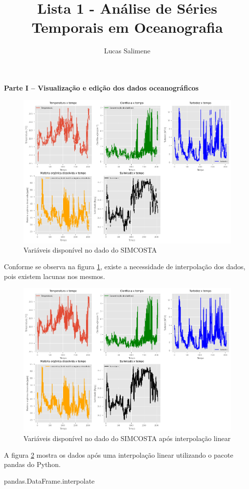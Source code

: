 \documentclass[12pt,a4paper,portuguese]{article}
\title{Lista 1 - Análise de Séries Temporais em Oceanografia}
\author{Lucas Salimene}
\date{}
\begin{document}
	
	\maketitle
	\newpage
	
	\textbf{Parte I – Visualização e edição dos dados oceanográficos}
	
	

\begin{figure}[H]
	\centering
	\includegraphics[width=1\linewidth]{lista1-1b}
	\caption{Variáveis disponível no dado do SIMCOSTA}
	\label{fig:lista1-1b}
\end{figure}
	Conforme se observa na figura \ref{fig:lista1-1b}, existe a necessidade de interpolação dos dados, pois existem lacunas nos mesmos.
	
\begin{figure}[H]
	\centering
	\includegraphics[width=1\linewidth]{lista1-1c}
	\caption{Variáveis disponível no dado do SIMCOSTA após interpolação linear}
	\label{fig:lista1-1c}
\end{figure}
	A figura \ref{fig:lista1-1c} mostra os dados após uma interpolação linear utilizando o pacote pandas do Python.
	\begin{python}
pandas.DataFrame.interpolate
	\end{python}
	
\end{document}

